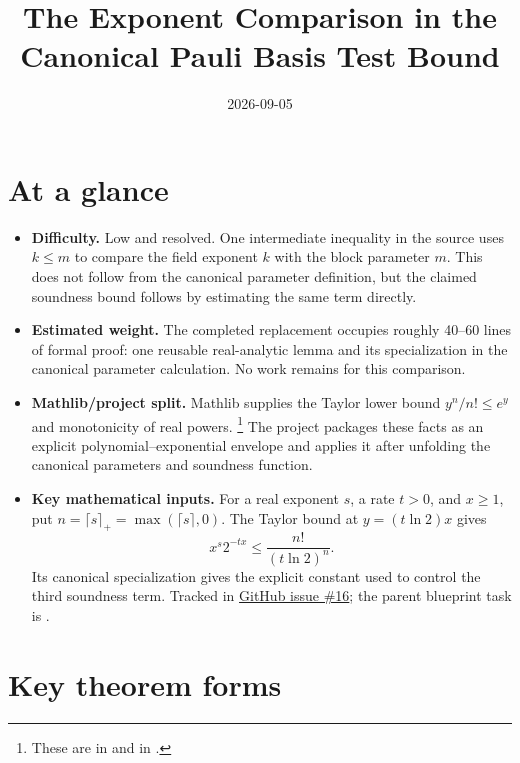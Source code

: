 \documentclass[11pt]{article}
\title{The Exponent Comparison in the Canonical Pauli Basis Test Bound}
\author{}
\date{2026-09-05}
\begin{document}
\maketitle

\section{At a glance}

\begin{itemize}
  \item \textbf{Difficulty.} Low and resolved.  One intermediate inequality
  in the source uses $k\leq m$ to compare the field exponent $k$ with the
  block parameter $m$.  This does not follow from the canonical parameter
  definition, but the claimed soundness bound follows by estimating the same
  term directly.
  \item \textbf{Estimated weight.} The completed replacement occupies roughly
  40--60 lines of formal proof: one reusable real-analytic lemma and its
  specialization in the canonical parameter calculation.  No work remains for
  this comparison.
  \item \textbf{Mathlib/project split.} Mathlib supplies the Taylor lower bound
  $y^n/n!\leq e^y$ and monotonicity of real powers.%
  \footnote{These are
   in
   and
   in
  .}
  The project packages these facts as an explicit polynomial--exponential
  envelope and applies it after unfolding the canonical parameters and
  soundness function.
  \item \textbf{Key mathematical inputs.} For a real exponent $s$, a rate
  $t>0$, and $x\geq1$, put
  $n=\lceil s\rceil_{+}=\max(\lceil s\rceil,0)$.  The Taylor bound at
  $y=(t\ln 2)x$ gives
  \[
    x^s2^{-tx}\leq \frac{n!}{(t\ln 2)^n}.
  \]
  Its canonical specialization gives the explicit constant used to control
  the third soundness term.
  Tracked in
  \href{https://github.com/Dengnifer/MIPStarRE-QPBT/issues/16}{GitHub issue \#16};
  the parent blueprint task is .
\end{itemize}

\section{Key theorem forms}
\end{document}
